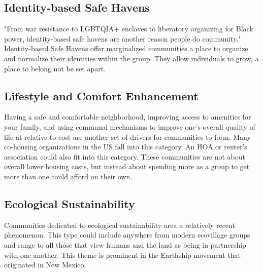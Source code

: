 \subsection{Identity-based Safe Havens}
"From war resistance to LGBTQIA+ enclaves to liberatory organizing for Black power, identity-based safe havens are another reason people do community." Identity-based Safe Havens offer marginalized communities a place to organize and normalize their identities within the group. They allow individuals to grow, a place to belong not be set apart.
\subsection{Lifestyle and Comfort Enhancement}
Having a safe and comfortable neighborhood, improving access to amenities for your family, and using communal mechanisms to improve one's overall quality of life at relative to cost are another set of drivers for communities to form. Many co-housing organizations in the US fall into this category. An HOA or renter's association could also fit into this category. These communities are not about overall lower housing costs, but instead about spending more as a group to get more than one could afford on their own. 
\subsection{Ecological Sustainability}
Communities dedicated to ecological sustainability area a relatively recent phenomenon. This type could include anywhere from modern ecovillage groups and range to all those that view humans and the land as being in partnership with one another. This theme is prominent in the Earthship movement that originated in New Mexico.
